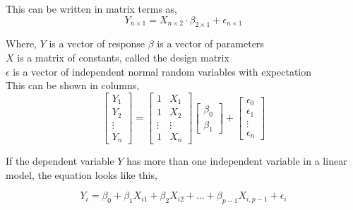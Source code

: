 	This can be written in matrix terms as, 
	$$Y_{n \times 1}=X_{n \times 2} \cdot \beta_{2 \times 1} + \epsilon_{n \times 1}$$	
	
	Where, \newline
	\textbf{$Y$} is a vector of response \newline
	\textbf{$\beta$} is a vector of parameters \\
	\textbf{$X$} is a matrix of constants, called the design matrix\\
	\textbf{$\epsilon$} is a vector of independent normal random variables with expectation\\
	
	This can be shown in columns,
	$$
	\left[
	\begin{array}{c}
		Y_1 \\ 
		Y_2 \\ 
		\vdots \\
		Y_n 
	\end{array}
	\right]
	=
	\left[
	\begin{array}{cc}
		1 & X_1 \\ 
		1 & X_2 \\ 
		\vdots & \vdots \\
		1 & X_n
	\end{array}
	\right]
	\left[
	\begin{array}{c}
		\beta_0 \\ 
		\beta_1 
	\end{array}
	\right]
	+
	\left[
	\begin{array}{c}
		\epsilon_0 \\ 
		\epsilon_1 \\
		\vdots \\
		\epsilon_n 
	\end{array}
	\right]
	$$
	
	If the dependent variable $Y$ has more than one independent variable in a linear model, the equation looks like this, 
	
	$$Y_i = \beta_0 + \beta_1 X_{i1} + \beta_2 X_{i2} + ... + \beta_{p-1} X_{i, p-1} + \epsilon_i$$
	
